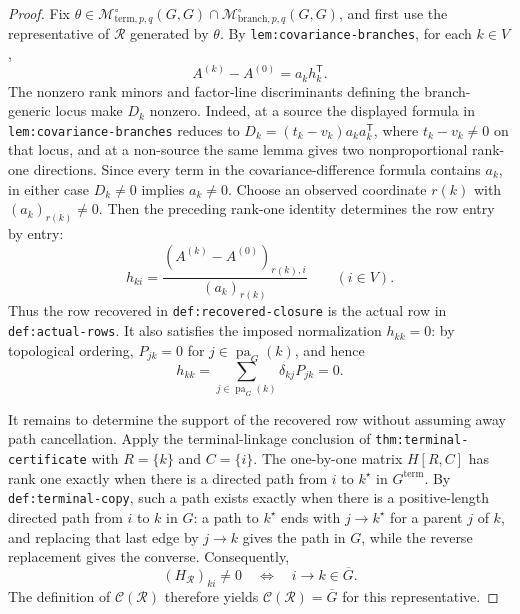 \documentclass{article}
\begin{document}
\begin{proof}
Fix \(\theta\in\mathcal M^{\circ}_{\mathrm{term},p,q}(G,G)\cap
\mathcal M^{\circ}_{\mathrm{branch},p,q}(G,G)\), and first use the representative of
\(\mathcal R\) generated by \(\theta\).  By \texttt{lem:covariance-branches}, for
each \(k\in V\),
\[
 A^{(k)}-A^{(0)}=a_kh_k^{\mathsf T}.
\]
The nonzero rank minors and factor-line discriminants defining the branch-generic
locus make \(D_k\) nonzero.  Indeed, at a source the displayed formula in
\texttt{lem:covariance-branches} reduces to
\(D_k=(t_k-v_k)a_ka_k^{\mathsf T}\), where \(t_k-v_k\ne0\) on that locus, and at
a non-source the same lemma gives two nonproportional rank-one directions.  Since
every term in the covariance-difference formula contains \(a_k\), in either case
\(D_k\ne0\) implies \(a_k\ne0\).  Choose an observed coordinate \(r(k)\) with
\((a_k)_{r(k)}\ne0\).  Then the preceding rank-one identity determines the row
entry by entry:
\[
 h_{ki}=\frac{(A^{(k)}-A^{(0)})_{r(k),i}}{(a_k)_{r(k)}}
 \qquad(i\in V).
\]
Thus the row recovered in \texttt{def:recovered-closure} is the actual row in
\texttt{def:actual-rows}.  It also satisfies the imposed normalization
\(h_{kk}=0\): by topological ordering, \(P_{jk}=0\) for
\(j\in\operatorname{pa}_G(k)\), and hence
\[
 h_{kk}=\sum_{j\in\operatorname{pa}_G(k)}\delta_{kj}P_{jk}=0.
\]

It remains to determine the support of the recovered row without assuming away
path cancellation.  Apply the terminal-linkage conclusion of
\texttt{thm:terminal-certificate} with \(R=\{k\}\) and \(C=\{i\}\).  The
one-by-one matrix \(H[R,C]\) has rank one exactly when there is a directed path
from \(i\) to \(k^{\star}\) in \(G^{\mathrm{term}}\).  By
\texttt{def:terminal-copy}, such a path exists exactly when there is a
positive-length directed path from \(i\) to \(k\) in \(G\): a path to
\(k^{\star}\) ends with \(j\to k^{\star}\) for a parent \(j\) of \(k\), and
replacing that last edge by \(j\to k\) gives the path in \(G\), while the reverse
replacement gives the converse.  Consequently,
\[
 (H_{\mathcal R})_{ki}\ne0
 \quad\Longleftrightarrow\quad
 i\to k\in\overline G.
\]
The definition of \(\mathcal C(\mathcal R)\) therefore yields
\(\mathcal C(\mathcal R)=\overline G\) for this representative.


\end{proof}
\end{document}

